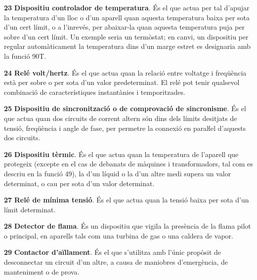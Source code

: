 \begin{multicols}{2}
\begin{list}{}
\item[\textbf{23}]   
\textbf{Dispositiu controlador de temperatura}. És el que actua per tal d'apujar la
temperatura d'un lloc o d'un aparell quan aquesta temperatura baixa
per sota d'un cert límit, o a l'inrevés, per abaixar-la quan aquesta
temperatura  puja per sobre d'un cert límit. Un exemple seria un
termòstat; en canvi, un dispositiu per regular automàticament la temperatura dins
d'un marge estret es designaria amb la funció 90T.

\item[\textbf{24}]  
 \textbf{Relé volt/hertz}.
És el que actua quan la relació  entre voltatge i freqüència està per sobre o  per sota d'un valor predeterminat. El relé pot tenir qualsevol combinació de característiques instantànies i temporitzades.

\item[\textbf{25}]   
\textbf{Dispositiu de sincronització o de comprovació
de sincronisme}. És el que actua quan dos circuits de corrent altern
són dins dels límits desitjats de tensió, freqüència i angle de
fase, per permetre la connexió en paraŀlel d'aquests dos circuits.


\item[\textbf{26}]    
\textbf{Dispositiu tèrmic}. És el que
actua quan la temperatura de l'aparell que protegeix (excepte en el cas de debanats de màquines i transformadors, tal com es descriu en la funció 49), la d'un líquid o la d'un altre medi  supera un valor
determinat, o cau per sota d'un valor determinat.


\item[\textbf{27}]   
\textbf{Relé de mínima tensió}. És el que
actua quan la tensió baixa per sota d'un límit determinat.

\item[\textbf{28}]   
\textbf{Detector de flama}. És un dispositiu que vigila la presència de la flama pilot o principal, en aparells tals com una turbina de gas o una caldera  de vapor.

\item[\textbf{29}]  
\textbf{Contactor d'aïllament}. És el que
s'utilitza amb l'únic propòsit de desconnectar un circuit d'un
altre,  a  causa de maniobres    d'emergència,  de manteniment o de
prova.


\end{list}
\end{multicols}
